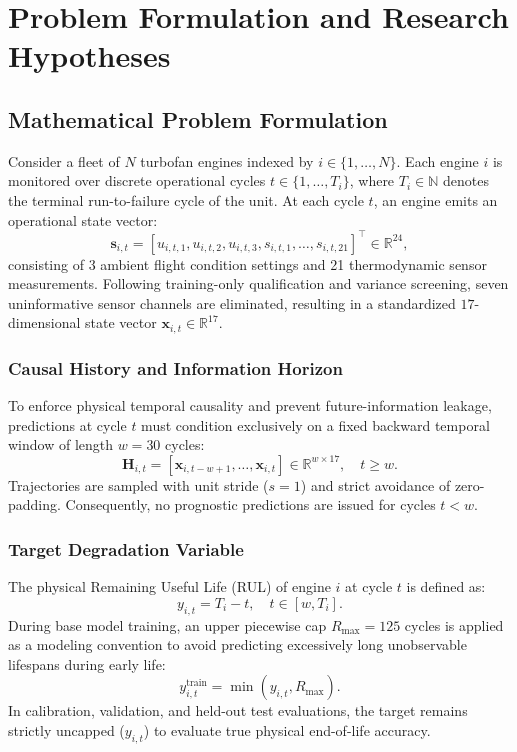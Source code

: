 \chapter{Problem Formulation and Research Hypotheses}
\label{chap:problem_hypotheses}

\section{Mathematical Problem Formulation}
Consider a fleet of $N$ turbofan engines indexed by $i \in \{1, \dots, N\}$. Each engine $i$ is monitored over discrete operational cycles $t \in \{1, \dots, T_i\}$, where $T_i \in \mathbb{N}$ denotes the terminal run-to-failure cycle of the unit. At each cycle $t$, an engine emits an operational state vector:
\begin{equation}
\mathbf{s}_{i,t} = [u_{i,t,1}, u_{i,t,2}, u_{i,t,3}, s_{i,t,1}, \dots, s_{i,t,21}]^\top \in \mathbb{R}^{24},
\end{equation}
consisting of 3 ambient flight condition settings and 21 thermodynamic sensor measurements. Following training-only qualification and variance screening, seven uninformative sensor channels are eliminated, resulting in a standardized $17$-dimensional state vector $\mathbf{x}_{i,t} \in \mathbb{R}^{17}$.

\subsection{Causal History and Information Horizon}
To enforce physical temporal causality and prevent future-information leakage, predictions at cycle $t$ must condition exclusively on a fixed backward temporal window of length $w = 30$ cycles:
\begin{equation}
\mathbf{H}_{i,t} = [\mathbf{x}_{i, t-w+1}, \dots, \mathbf{x}_{i,t}] \in \mathbb{R}^{w \times 17}, \quad t \ge w.
\end{equation}
Trajectories are sampled with unit stride ($s=1$) and strict avoidance of zero-padding. Consequently, no prognostic predictions are issued for cycles $t < w$.

\subsection{Target Degradation Variable}
The physical Remaining Useful Life (RUL) of engine $i$ at cycle $t$ is defined as:
\begin{equation}
y_{i,t} = T_i - t, \quad t \in [w, T_i].
\end{equation}
During base model training, an upper piecewise cap $R_{\text{max}} = 125$ cycles is applied as a modeling convention to avoid predicting excessively long unobservable lifespans during early life:
\begin{equation}
y_{i,t}^{\text{train}} = \min(y_{i,t}, R_{\text{max}}).
\end{equation}
In calibration, validation, and held-out test evaluations, the target remains strictly uncapped ($y_{i,t}$) to evaluate true physical end-of-life accuracy.

